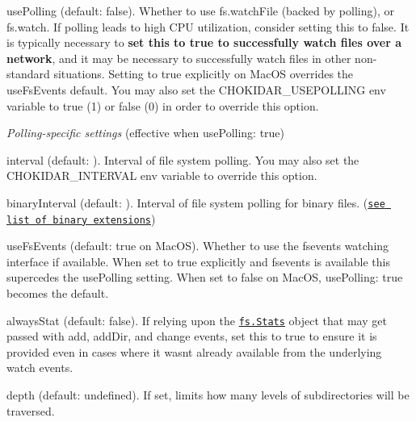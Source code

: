 \begin{DoxyItemize}
\item {\ttfamily use\+Polling} (default\+: {\ttfamily false}). Whether to use fs.\+watch\+File (backed by polling), or fs.\+watch. If polling leads to high C\+PU utilization, consider setting this to {\ttfamily false}. It is typically necessary to {\bfseries set this to {\ttfamily true} to successfully watch files over a network}, and it may be necessary to successfully watch files in other non-\/standard situations. Setting to {\ttfamily true} explicitly on Mac\+OS overrides the {\ttfamily use\+Fs\+Events} default. You may also set the C\+H\+O\+K\+I\+D\+A\+R\+\_\+\+U\+S\+E\+P\+O\+L\+L\+I\+NG env variable to true (1) or false (0) in order to override this option.
\item {\itshape Polling-\/specific settings} (effective when {\ttfamily use\+Polling\+: true})
\begin{DoxyItemize}
\item {\ttfamily interval} (default\+: {}). Interval of file system polling. You may also set the C\+H\+O\+K\+I\+D\+A\+R\+\_\+\+I\+N\+T\+E\+R\+V\+AL env variable to override this option.
\item {\ttfamily binary\+Interval} (default\+: {}). Interval of file system polling for binary files. (\href{https://github.com/sindresorhus/binary-extensions/blob/master/binary-extensions.json}{\tt see list of binary extensions})
\end{DoxyItemize}
\item {\ttfamily use\+Fs\+Events} (default\+: {\ttfamily true} on Mac\+OS). Whether to use the {\ttfamily fsevents} watching interface if available. When set to {\ttfamily true} explicitly and {\ttfamily fsevents} is available this supercedes the {\ttfamily use\+Polling} setting. When set to {\ttfamily false} on Mac\+OS, {\ttfamily use\+Polling\+: true} becomes the default.
\item {\ttfamily always\+Stat} (default\+: {\ttfamily false}). If relying upon the \href{http://nodejs.org/api/fs.html#fs_class_fs_stats}{\tt {\ttfamily fs.\+Stats}} object that may get passed with {\ttfamily add}, {\ttfamily add\+Dir}, and {\ttfamily change} events, set this to {\ttfamily true} to ensure it is provided even in cases where it wasn\textquotesingle{}t already available from the underlying watch events.
\item {\ttfamily depth} (default\+: {\ttfamily undefined}). If set, limits how many levels of subdirectories will be traversed.

\end{DoxyItemize}
